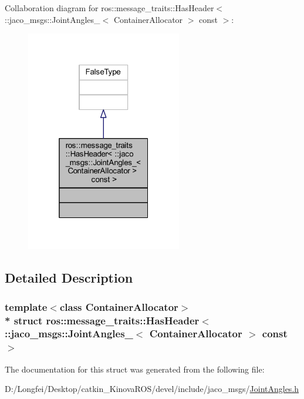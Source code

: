 Collaboration diagram for ros\+:\+:message\+\_\+traits\+:\+:Has\+Header$<$ \+:\+:jaco\+\_\+msgs\+:\+:Joint\+Angles\+\_\+$<$ Container\+Allocator $>$ const $>$\+:
\nopagebreak
\begin{figure}[H]
\begin{center}
\leavevmode
\includegraphics[width=193pt]{d7/d0a/structros_1_1message__traits_1_1HasHeader_3_01_1_1jaco__msgs_1_1JointAngles___3_01ContainerAlloc9809902280df779f1de229c6823dbce6}
\end{center}
\end{figure}


\subsection{Detailed Description}
\subsubsection*{template$<$class Container\+Allocator$>$\\*
struct ros\+::message\+\_\+traits\+::\+Has\+Header$<$ \+::jaco\+\_\+msgs\+::\+Joint\+Angles\+\_\+$<$ Container\+Allocator $>$ const  $>$}



The documentation for this struct was generated from the following file\+:\begin{DoxyCompactItemize}
\item 
D\+:/\+Longfei/\+Desktop/catkin\+\_\+\+Kinova\+R\+O\+S/devel/include/jaco\+\_\+msgs/\hyperlink{JointAngles_8h}{Joint\+Angles.\+h}\end{DoxyCompactItemize}
